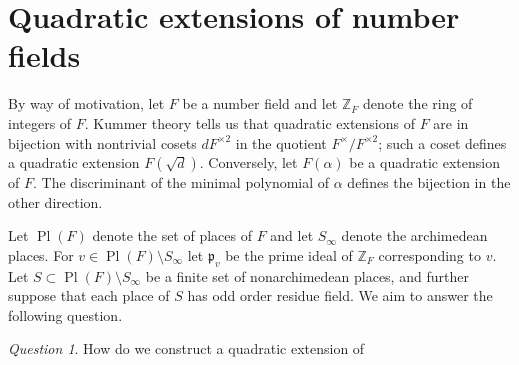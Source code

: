 \documentclass{dcthesis}
\newcommand{\ZZ}{\mathbb Z}
\DeclareMathOperator{\Pl}{Pl}
\numberwithin{equation}{section}
\theoremstyle{definition}
\theoremstyle{remark}
\newtheorem{question}[equation]{Question}
\begin{document}
{{  \section{Quadratic extensions of number fields}{
    \label{sec:numberfields}
    By way of motivation,
    let $F$ be a number field
    and let $\ZZ_F$ denote the ring of integers
    of $F$.
    Kummer theory tells us that quadratic
    extensions of $F$ are in bijection with
    nontrivial cosets $dF^{\times 2}$
    in the quotient
    $F^\times/F^{\times 2}$;
    such a coset defines a
    quadratic extension
    $F(\sqrt{d})$.
    Conversely,
    let $F(\alpha)$ be a quadratic extension of $F$.
    The discriminant of the minimal polynomial
    of $\alpha$ defines the bijection in the other
    direction.
    \par
    Let $\Pl(F)$ denote the set of places of $F$
    and let $S_\infty$ denote the archimedean
    places.
    For $v\in\Pl(F)\setminus S_\infty$
    let $\mathfrak{p}_v$
    be the prime ideal of $\ZZ_F$ corresponding
    to $v$.
    Let $S\subset\Pl(F)\setminus S_\infty$
    be a finite set of nonarchimedean places,
    and further suppose that each place of $S$
    has odd order residue field.
    We aim to answer the following question.
    \begin{question}
      \label{ques:construct}
      How do we construct a
      quadratic extension of

\end{question}}}}
\end{document}
